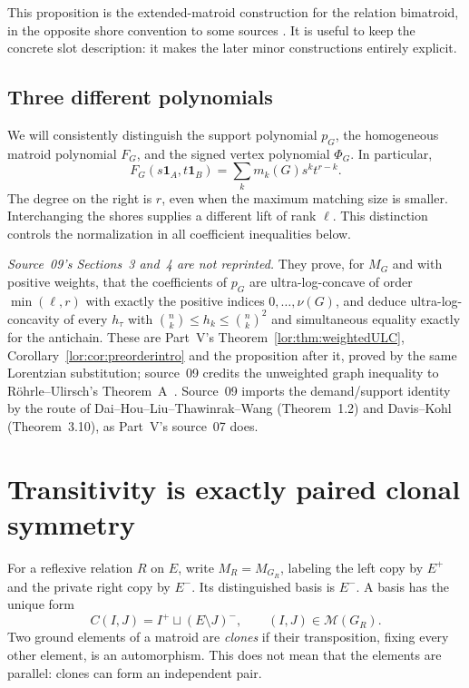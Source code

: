 \documentclass[11pt]{article}
\numberwithin{equation}{section}
\theoremstyle{definition}
\newcommand{\one}{\mathbf 1}
\newcommand{\PM}{\mathcal M}
\begin{document}
This proposition is the extended-matroid construction for the relation
bimatroid, in the opposite shore convention to some sources \cite{RU}.
It is useful to keep the concrete slot description: it makes the later
minor constructions entirely explicit.

\subsection{Three different polynomials}
We will consistently distinguish the support polynomial $p_G$, the
homogeneous matroid polynomial $F_G$, and the signed vertex polynomial
$\Phi_G$. In particular,
\begin{equation}
 F_G(s\one_A,t\one_B)=\sum_k m_k(G)s^k t^{r-k}.
\label{mat:eq:bivariate}
\end{equation}
The degree on the right is $r$, even when the maximum matching size is
smaller. Interchanging the shores supplies a different lift of rank
$\ell$. This distinction controls the normalization in all coefficient
inequalities below.

\noindent\emph{Source~09's Sections~3 and~4 are not reprinted.} They prove,
for $M_G$ and with positive weights, that the coefficients of $p_G$ are
ultra-log-concave of order $\min(\ell,r)$ with exactly the positive indices
$0,\ldots,\nu(G)$, and deduce ultra-log-concavity of every $h_\tau$ with
$\binom nk\le h_k\le\binom nk^2$ and simultaneous equality exactly for the
antichain. These are Part~V's Theorem~\ref{lor:thm:weightedULC},
Corollary~\ref{lor:cor:preorderintro} and the proposition after it, proved by
the same Lorentzian substitution; source~09 credits the unweighted graph
inequality to R\"ohrle--Ulirsch's Theorem~A~\cite{RU}. Source~09 imports the
demand/support identity by the route of Dai--Hou--Liu--Thawinrak--Wang
(Theorem~1.2) and Davis--Kohl (Theorem~3.10), as Part~V's source~07 does.

\section{Transitivity is exactly paired clonal symmetry}
\label{mat:sec:clones}
For a reflexive relation $R$ on $E$, write $M_R=M_{G_R}$, labeling the left
copy by $E^+$ and the private right copy by $E^-$. Its distinguished basis
is $E^-$. A basis has the unique form
\begin{equation}
 C(I,J)=I^+\sqcup(E\setminus J)^-,\qquad (I,J)\in\PM(G_R).
\label{mat:eq:CIJ}
\end{equation}
Two ground elements of a matroid are \emph{clones} if their transposition,
fixing every other element, is an automorphism. This does not mean that the
elements are parallel: clones can form an independent pair.
\end{document}
